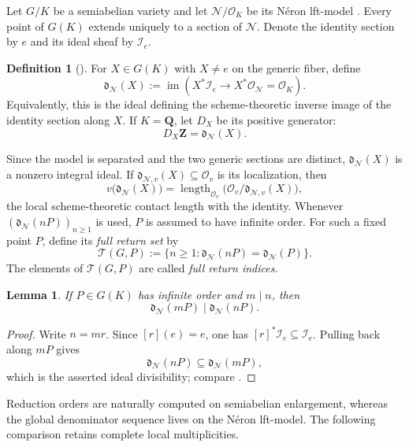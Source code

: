 \documentclass[11pt,letterpaper,reqno]{amsart}
\newtheorem{lemma}[theorem]{Lemma}
\theoremstyle{definition}
\newtheorem{definition}[theorem]{Definition}
\theoremstyle{remark}
\newcommand{\Q}{\mathbf Q}
\newcommand{\Z}{\mathbf Z}
\newcommand{\OK}{\mathcal O_K}
\newcommand{\dd}{\mathfrak d}
\newcommand{\cO}{\mathcal O}
\newcommand{\Ner}{\mathcal N}
\DeclareMathOperator{\length}{length}
\begin{document}
Let $G/K$ be a semiabelian variety and let $\Ner/\OK$ be its N\'eron
lft-model \cite[Chapter~10]{BLR1990}.  Every point of $G(K)$ extends uniquely
to a section of $\Ner$.  Denote the identity section by $e$ and its ideal
sheaf by $\mathcal I_e$.

\begin{definition}[{\cite[Definition~4]{Silverman2005}}]\label{def:denominator}
For $X\in G(K)$ with $X\ne e$ on the generic fiber, define
\[
 \dd_{\Ner}(X):=
 \operatorname{im}\left(
 X^*\mathcal I_e\longrightarrow X^*\mathcal O_{\Ner}=\OK
 \right).
\]
Equivalently, this is the ideal defining the scheme-theoretic inverse image of
the identity section along $X$.  If $K=\Q$, let $D_X$ be its positive
generator:
\[
 D_X\Z=\dd_{\Ner}(X).
\]
\end{definition}

Since the model is separated and the two generic sections are distinct,
$\dd_{\Ner}(X)$ is a nonzero integral ideal.  If
$\dd_{\Ner,v}(X)\subseteq\cO_v$ is its localization, then
\[
 v\bigl(\dd_{\Ner}(X)\bigr)
 =\length_{\cO_v}\bigl(\cO_v/\dd_{\Ner,v}(X)\bigr),
\]
the local scheme-theoretic contact length with the identity.  Whenever
$(\dd_{\Ner}(nP))_{n\ge1}$ is used, $P$ is assumed to have infinite order.
For such a fixed point $P$, define its \emph{full return set} by
\[
 \mathscr T(G,P)
 :=\{n\ge1:\dd_{\Ner}(nP)=\dd_{\Ner}(P)\}.
\]
The elements of $\mathscr T(G,P)$ are called \emph{full return indices}.

\begin{lemma}\label{lem:ideal-divisibility}
If $P\in G(K)$ has infinite order and $m\mid n$, then
\[
 \dd_{\Ner}(mP)\mid\dd_{\Ner}(nP).
\]
\end{lemma}

\begin{proof}
Write $n=mr$.  Since $[r](e)=e$, one has
$[r]^*\mathcal I_e\subseteq\mathcal I_e$.  Pulling back along $mP$ gives
\[
 \dd_{\Ner}(nP)\subseteq\dd_{\Ner}(mP),
\]
which is the asserted ideal divisibility; compare
\cite[Proposition~8]{Silverman2005}.
\end{proof}

Reduction orders are naturally computed on semiabelian enlargement,
whereas the global denominator sequence lives on the N\'eron lft-model.  The following comparison retains complete local multiplicities.
\end{document}
